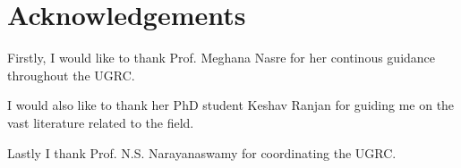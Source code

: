 \documentclass[a4paper,10pt]{article}
\theoremstyle{plain} %
\theoremstyle{plain} %
\begin{document}
\section{Acknowledgements}
Firstly, I would like to thank Prof. Meghana Nasre for her continous guidance throughout the UGRC. 

I would also like to thank her PhD student Keshav Ranjan for guiding me on the vast literature related to the field. 

Lastly I thank Prof. N.S. Narayanaswamy for coordinating the UGRC.



\end{document}

